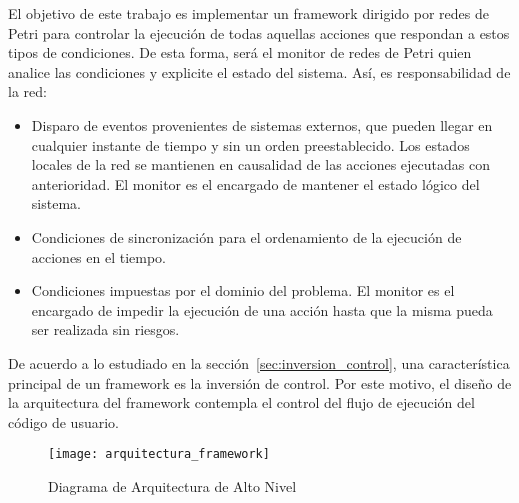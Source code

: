 El objetivo de este trabajo es implementar un framework dirigido por redes de
Petri para controlar la ejecución de todas aquellas acciones que respondan a
estos tipos de condiciones.
De esta forma, será el monitor de redes de Petri quien analice las condiciones y
explicite el estado del sistema. Así, es responsabilidad de la red:
\begin{itemize}
  \item Disparo de eventos provenientes de sistemas externos, que pueden llegar
  en cualquier instante de tiempo y sin un orden preestablecido. Los estados
  locales de la red se mantienen en causalidad de las acciones ejecutadas con
  anterioridad. El monitor es el encargado de mantener el estado lógico del
  sistema.
  
  \item Condiciones de sincronización para el ordenamiento de la ejecución de
  acciones en el tiempo. 
  
  \item Condiciones impuestas por el dominio del problema. El monitor es el
  encargado de impedir la ejecución de una acción hasta que la misma pueda ser
  realizada sin riesgos.
\end{itemize}

De acuerdo a lo estudiado en la sección~\ref{sec:inversion_control}, una
característica principal de un framework es la inversión de control. Por este
motivo, el diseño de la arquitectura del framework contempla el control del
flujo de ejecución del código de usuario.

\begin{figure}[H]
	\centering
	\texttt{[image: arquitectura\_framework]}
	\caption{Diagrama de Arquitectura de Alto Nivel}
	\label{fig:arquitectura_petri-manejador-acciones-mundo}
\end{figure}

